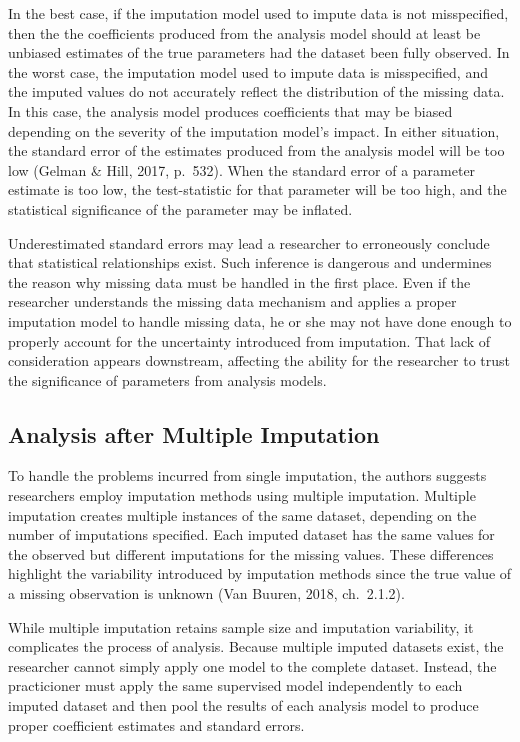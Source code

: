 \documentclass[12pt,oneside]{chicagocapstone}
\begin{document}
In the best case, if the imputation model used to impute data is not
misspecified, then the the coefficients produced from the analysis model
should at least be unbiased estimates of the true parameters had the
dataset been fully observed. In the worst case, the imputation model
used to impute data is misspecified, and the imputed values do not
accurately reflect the distribution of the missing data. In this case,
the analysis model produces coefficients that may be biased depending on
the severity of the imputation model's impact. In either situation, the
standard error of the estimates produced from the analysis model will be
too low (Gelman \& Hill, 2017, p.~532). When the standard error of a
parameter estimate is too low, the test-statistic for that parameter
will be too high, and the statistical significance of the parameter may
be inflated.

Underestimated standard errors may lead a researcher to erroneously
conclude that statistical relationships exist. Such inference is
dangerous and undermines the reason why missing data must be handled in
the first place. Even if the researcher understands the missing data
mechanism and applies a proper imputation model to handle missing data,
he or she may not have done enough to properly account for the
uncertainty introduced from imputation. That lack of consideration
appears downstream, affecting the ability for the researcher to trust
the significance of parameters from analysis models.

\subsection*{Analysis after Multiple
Imputation}\label{background-analysis-multiple}

To handle the problems incurred from single imputation, the authors
suggests researchers employ imputation methods using multiple
imputation. Multiple imputation creates multiple instances of the same
dataset, depending on the number of imputations specified. Each imputed
dataset has the same values for the observed but different imputations
for the missing values. These differences highlight the variability
introduced by imputation methods since the true value of a missing
observation is unknown (Van Buuren, 2018, ch.~2.1.2).

While multiple imputation retains sample size and imputation
variability, it complicates the process of analysis. Because multiple
imputed datasets exist, the researcher cannot simply apply one model to
the complete dataset. Instead, the practicioner must apply the same
supervised model independently to each imputed dataset and then pool the
results of each analysis model to produce proper coefficient estimates
and standard errors.
\end{document}
